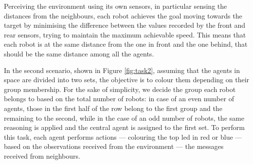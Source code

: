 Perceiving the environment using its own sensors, in particular sensing the 
distances from the neighbours, each robot achieves the goal moving towards the 
target by minimising the difference between the values recorded by the front and 
rear sensors, trying to maintain the maximum achievable speed. This means that 
each robot is at the same distance from the one in front and the one behind, that 
should be the same distance among all the agents.

\bigskip
In the second scenario, shown in Figure \ref{fig:task2}, assuming that the agents 
in space are divided into two sets, the objective is to colour them depending on 
their group membership. 
For the sake of simplicity, we decide the group each robot belongs to based on 
the total number of robots: in case of an even number of agents, those in the first 
half of the row belong to the first group and the remaining to the second, while in 
the case of an odd number of robots, the same reasoning is applied and the 
central agent is assigned to the first set.
To perform this task, each agent performs actions — colouring the top \gls{led} 
in red or blue — based on the observations received from the environment — the 
messages received from neighbours. 
